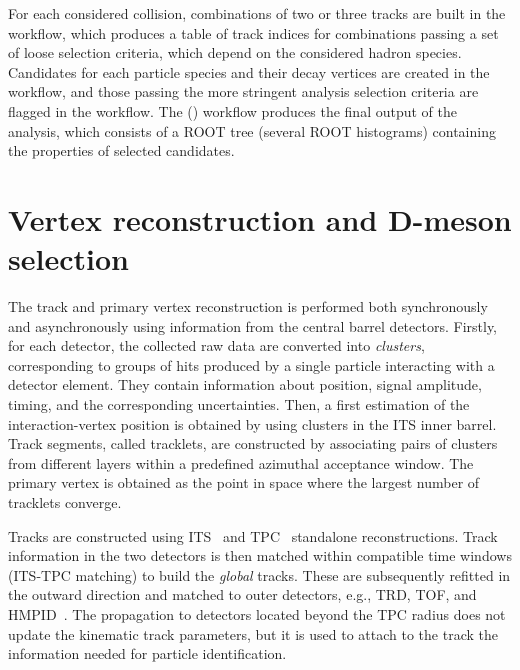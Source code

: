 For each considered collision, combinations of two or three tracks are built in the  workflow, which produces a table of track indices for combinations passing a set of loose selection criteria, which depend on the considered hadron species. Candidates for each particle species and their decay vertices are created in the  workflow, and those passing the more stringent analysis selection criteria are flagged in the  workflow. The  () workflow produces the final output of the analysis, which consists of a ROOT tree (several ROOT histograms) containing the properties of selected candidates.

\section{Vertex reconstruction and D-meson selection}

The track and primary vertex reconstruction is performed both synchronously and asynchronously using information from the central barrel detectors. Firstly, for each detector, the collected raw data are converted into \emph{clusters}, corresponding to groups of hits produced by a single particle interacting with a detector element. They contain information about position, signal amplitude, timing, and the corresponding uncertainties. Then, a first estimation of the interaction-vertex position is obtained by using clusters in the ITS inner barrel. Track segments, called tracklets, are constructed by associating pairs of clusters from different layers within a predefined azimuthal acceptance window. The primary vertex is obtained as the point in space where the largest number of tracklets converge. 

Tracks are constructed using ITS~\cite{Concas:2878385} and TPC~\cite{Rohr:2018cxc} standalone reconstructions. Track information in the two detectors is then matched within compatible time windows (ITS-TPC matching) to build the \emph{global} tracks. These are subsequently refitted in the outward direction and matched to outer detectors, e.g., TRD, TOF, and HMPID~\cite{Rohr:2019ava}. The propagation to detectors located beyond the TPC radius does not update the kinematic track parameters, but it is used to attach to the track the information needed for particle identification.

